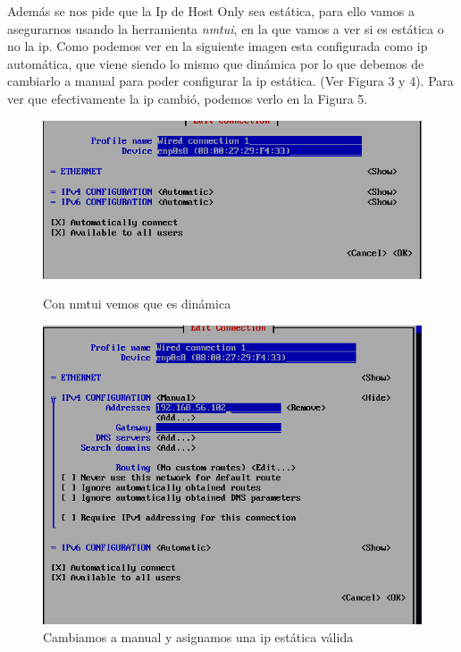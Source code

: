 Además se nos pide que la Ip de Host Only sea estática, para ello vamos a asegurarnos usando la herramienta \textit{nmtui}, en la que vamos a ver si es estática o no la ip. Como podemos ver en la siguiente imagen esta configurada como ip automática, que viene siendo lo mismo que dinámica por lo que debemos de cambiarlo a manual para poder configurar la ip estática. (Ver Figura 3 y 4). Para ver que efectivamente la ip cambió, podemos verlo en la Figura 5.
\begin{figure}[htbp]
    \centering
    \begin{minipage}[b]{0.45\textwidth}
        \centering
        \includegraphics[width=\textwidth]{images/Bloque1/nmtui1.png}
        \caption{Con nmtui vemos que es dinámica}
    \end{minipage}
    \hfill
    \begin{minipage}[b]{0.45\textwidth}
        \centering
        \includegraphics[width=\textwidth]{images/Bloque1/nmtui_2.png}
        \caption{Cambiamos a manual y asignamos una ip estática válida}
    \end{minipage}
\end{figure}




